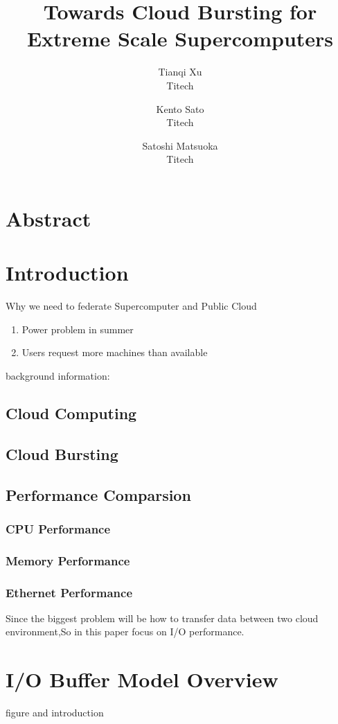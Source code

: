 \documentclass{article}
\begin{document}
	\title{Towards Cloud Bursting for Extreme Scale Supercomputers}
	\author{Tianqi Xu \\ Titech \and Kento Sato \\Titech \and Satoshi Matsuoka\\Titech}
	\date{}
\maketitle


\section*{Abstract}


\section{Introduction}
Why we need to federate Supercomputer and Public Cloud
	\begin{enumerate}
		\item Power problem in summer
		\item Users request more machines than available
	\end{enumerate}
background information:
	\subsection{Cloud Computing}
	\subsection{Cloud Bursting}
	\subsection{Performance Comparsion}
		\subsubsection{CPU Performance}
		\subsubsection{Memory Performance}
		\subsubsection{Ethernet Performance}
Since the biggest problem will be how to transfer data between two cloud environment,So in this paper focus on I/O performance.


\section{I/O Buffer Model Overview}
figure and introduction
\end{document}
